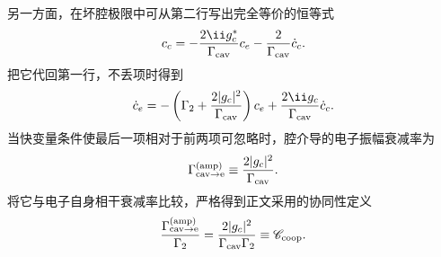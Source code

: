 \begin{derivation}[开放单模耦合的线宽与协作参数]
另一方面，在坏腔极限中可从第二行写出完全等价的恒等式
\begin{equation*}
c_c
=-\frac{2\ii g_c^*}{\Gamma_{\rm cav}}c_e
-\frac{2}{\Gamma_{\rm cav}}\dot c_c.
\end{equation*}
把它代回第一行，不丢项时得到
\begin{equation*}
\dot c_e
=-\left(\Gamma_2+\frac{2|g_c|^2}{\Gamma_{\rm cav}}\right)c_e
+\frac{2\ii g_c}{\Gamma_{\rm cav}}\dot c_c.
\end{equation*}
当快变量条件使最后一项相对于前两项可忽略时，腔介导的电子振幅衰减率为
\begin{equation*}
\Gamma_{\rm cav\to e}^{({\rm amp})}
\equiv\frac{2|g_c|^2}{\Gamma_{\rm cav}}.
\end{equation*}
将它与电子自身相干衰减率比较，严格得到正文采用的协同性定义
\begin{equation*}
\frac{\Gamma_{\rm cav\to e}^{({\rm amp})}}{\Gamma_2}
=\frac{2|g_c|^2}{\Gamma_{\rm cav}\Gamma_2}
\equiv\mathscr C_{\rm coop}.
\end{equation*}
\end{derivation}



























